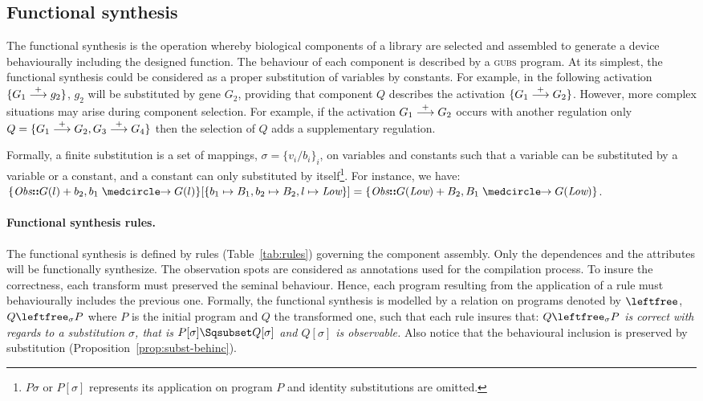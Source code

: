 \documentclass{eptcs}
\newcommand{\ie}[0]{\abbrev{\textit{i.e.}}}
\newcommand{\activate}[0]{\stackrel{+}{\reg}}
\newcounter{ti}
\begin{document}
\subsection{Functional synthesis}
The functional synthesis is the operation whereby biological components of a library are selected and assembled to generate a device behaviourally including the designed function. The behaviour of each component is described by a \textsc{gubs} program. At its simplest, the functional synthesis could be considered as a proper substitution of variables by constants. For example, in the following activation $\{G_1 \activate g_2\}$, $g_2$ will be substituted by gene $G_2$, providing that component $Q$ describes the activation $\{ G_1 \activate G_2 \}$. However, more complex situations may arise during component selection. For example, if the activation $G_1 \activate G_2$ occurs with another regulation only \ie $Q=\{G_1 \activate G_2, G_3 \activate G_4 \}$ then the selection of $Q$ adds a supplementary regulation.

Formally, a finite substitution is a set of mappings, $\sigma=\{ v_i / b_i \}_i$, on variables and constants such that a variable can be substituted by a variable or a constant, and a constant can only substituted by itself\footnote{ $P\sigma$ or $P[\sigma]$ represents its application on program $P$ and identity substitutions are omitted.}. For instance, we have:
$\{\textit{Obs}\textbf{::} G(l)+b_2, b_1 \cause G(l) \}[\{b_1 \mapsto B_1,b_2 \mapsto B_2, l \mapsto \textit{Low}\}]= 
\{\textit{Obs}\textbf{::} G(\textit{Low})+B_2, B_1 \cause G(\textit{Low}) \}$.

\paragraph{Functional synthesis rules.} The functional synthesis is defined by rules (Table~\ref{tab:rules}) governing the component assembly. Only the dependences and the attributes will be functionally synthesize. 
The observation spots are considered as annotations used for the compilation process. 
To insure the correctness, each transform must preserved the seminal behaviour. Hence, 
each program resulting from the application of a rule must behaviourally includes the previous one. 
Formally, the functional synthesis is modelled by a relation on programs denoted by $\leftfree$, \ie $Q \leftfree_\sigma P$ where $P$ is the initial program and $Q$ the transformed one, such that each rule insures that:
\emph{$Q \leftfree_\sigma P$ is correct with regards to a substitution $\sigma$, that is 
$P[\sigma] \Sqsubset Q[\sigma]$ and $Q[\sigma]$ is observable.}
Also notice that the behavioural inclusion is preserved by substitution (Proposition~\ref{prop:subst-behinc}). 
\end{document}
